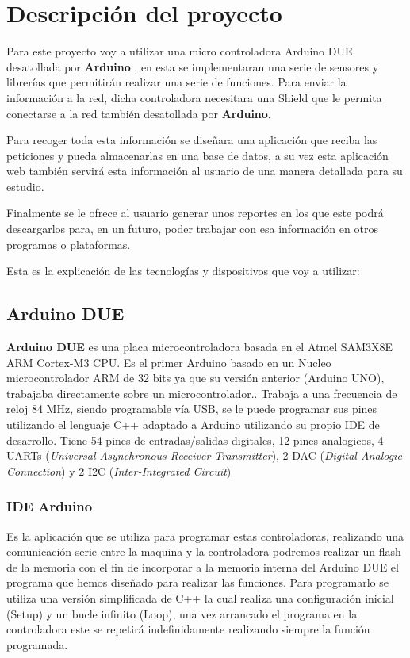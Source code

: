 
\chapter{Descripción del proyecto}

Para este proyecto voy a utilizar una micro controladora Arduino DUE desatollada por \textbf{Arduino} , en esta se implementaran una serie de sensores y librerías que permitirán realizar una serie de funciones. Para enviar la información a la red, dicha controladora necesitara una Shield que le permita conectarse a la red también desatollada por \textbf{Arduino}.

Para recoger toda esta información se diseñara una aplicación que reciba las peticiones y pueda almacenarlas en una base de datos, a su vez esta aplicación web también servirá esta información al usuario de una manera detallada para su estudio.

Finalmente se le ofrece al usuario generar unos reportes en los que este podrá descargarlos para, en un futuro, poder trabajar con esa información en otros programas o plataformas.

Esta es la explicación de las tecnologías y dispositivos que voy a utilizar:

\section{Arduino DUE}

\textbf{Arduino DUE }es una placa microcontroladora basada en el Atmel SAM3X8E ARM Cortex-M3 CPU. Es el primer Arduino basado en un Nucleo microcontrolador ARM de 32 bits ya que su versión anterior (Arduino UNO), trabajaba directamente sobre un microcontrolador.. Trabaja a una frecuencia de reloj 84 MHz, siendo programable vía USB, se le puede programar sus pines utilizando el lenguaje C++ adaptado a Arduino utilizando su propio IDE de desarrollo.
 Tiene 54 pines de entradas/salidas digitales, 12 pines analogicos, 4 UARTs (\textit{Universal Asynchronous Receiver-Transmitter}), 2 DAC (\textit{Digital Analogic Connection}) y 2 I2C (\textit{Inter-Integrated Circuit})
 
 \subsection{IDE Arduino}
 
 Es la aplicación que se utiliza para programar estas controladoras, realizando una comunicación serie entre la maquina y la controladora podremos realizar un flash de la memoria con el fin de incorporar a la memoria interna del Arduino DUE el programa que hemos diseñado para realizar las funciones. 
 Para programarlo se utiliza una versión simplificada de C++ la cual realiza una configuración inicial (Setup) y un bucle infinito (Loop), una vez arrancado el programa en la controladora este se repetirá indefinidamente realizando siempre la función programada. 
 
